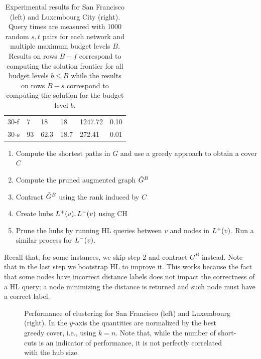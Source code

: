 \begin{table}
{\begin{tabular}{ | l | p{1cm} | p{1cm} | p{1cm} | p{1.2cm} | p{1.2cm} |}
30-f & 7  & 18   & 18   & 1247.72 & 0.10 \\
30-s & 93 & 62.3 & 18.7 & 272.41  & 0.01 \\ \hline
\end{tabular}%
}
\vspace{13pt}
\caption{Experimental results for San Francisco (left) and Luxembourg City (right). Query times are measured with 1000 random $s,t$ pairs for each network and multiple maximum budget levels $B$. Results on rows $B-f$ correspond to computing the solution frontier for all budget levels $b\leq B$ while the results on rows $B-s$ correspond to computing the solution for the budget level $b$.}
\label{tab:performance_results}
\end{table}


\begin{enumerate}[nosep]
\item Compute the shortest paths in $G$ and use a greedy approach to obtain a cover $C$
\item Compute the pruned augmented graph $\tilde G^B$
\item Contract $\tilde G^B$ using the rank induced by $C$
\item Create hubs $L^+(v),L^-(v)$ using CH
\item Prune the hubs by running HL queries between $v$ and nodes in $L^+(v)$. 
Run a similar process for $L^-(v)$.
\end{enumerate}
Recall that, for some instances, we skip step 2 and contract $G^B$ instead.
Note that in the last step we bootstrap HL to improve it.
This works because the fact that some nodes have incorrect distance labels does not impact the correctness of a HL query; a node minimizing the distance is returned and such node must have a correct label.

\begin{figure}
\begin{minipage}{0.25\textwidth}
\centering

\end{minipage}%
\begin{minipage}{0.25\textwidth}
\centering

\end{minipage}
\caption{Performance of clustering for San Francisco (left) and Luxembourg (right). 
In the $y$-axis the quantities are normalized by the best greedy cover, i.e., using $k=n$.
Note that, while the number of short-cuts is an indicator of performance, it is not perfectly correlated with the hub size.}
\label{fig:clusters}
\end{figure}


